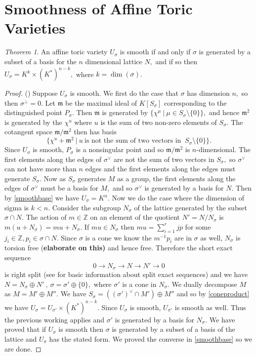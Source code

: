 \documentclass[BSc]{usydthesis}
\numberwithin{equation}{chapter}
\theoremstyle{remark}
\newtheorem{Theorem}[equation]{Theorem}
\newcommand{\Z}{\mathbb{Z}}
\newcommand{\V}{\vee}
\begin{document}
\section{Smoothness of Affine Toric Varieties}
\begin{Theorem}\label{Smooth} An affine toric variety $U_{\sigma}$ is smooth if and only if $\sigma$ is generated by a subset of a basis for the $n$ dimensional lattice $N,$ and if so then $U_{\sigma} = K^k \times (K^{*})^{n-k},$ where $k=\dim (\sigma).$ 
 
\end{Theorem}

\begin{proof}(\cite[Page.~ 28]{Fulton:Toric})
Suppose $U_{\sigma}$ is smooth. We first do the case that $\sigma$ has dimension $n,$ so then $\sigma^{\perp} = 0.$ Let $\mathfrak{m}$ be the maximal ideal of $K[S_{\sigma}]$ corresponding to the distinguished point $P_{\sigma}.$ Then $\mathfrak{m}$ is generated by $\{ \chi^{\mu} \ | \ \mu\in S_{\sigma}\setminus \{0\} \},$ and hence $\mathfrak{m}^2$ is generated by the $\chi^u$ where $u$ is the sum of two non-zero elements of $S_{\sigma}.$ The cotangent space $\mathfrak{m}/\mathfrak{m}^2$ then has basis $$\{ \chi^u + \mathfrak{m}^2 \ | \ u \ \text{is not the sum of two vectors in } \ S_{\sigma}\setminus\{ 0 \} \}.$$ Since $U_{\sigma}$ is smooth, $P_{\sigma}$ is a nonsingular point and so $\mathfrak{m}/\mathfrak{m}^2$ is $n$-dimensional. The first elements along the edges of $\sigma^{\V}$ are not the sum of two vectors in $S_{\sigma},$ so $\sigma^{\V}$ can not have more than $n$ edges and the first elements along the edges must generate $S_{\sigma}.$ Now as $S_{\sigma}$ generates $M$ as a group, the first elements along the edges of $\sigma^{\V}$ must be a basis for $M,$ and so $\sigma^{\V}$ is generated by a basis for $N.$ Then by \ref{smoothbase} we have $U_{\sigma} = K^n.$ Now we do the case where the dimension of sigma is $k<n.$ Consider the subgroup $N_{\sigma}$ of the lattice generated by the subset $\sigma \cap N.$ The action of $m\in \Z$ on an element of the quotient $N'=N/N_{\sigma}$ is $m(u+N_{\sigma})=mu+N_{\sigma}.$ If $mu\in N_{\sigma}$ then $mu= \sum_{i=1}^{r} jp$ for some $j_i\in \Z, p_i\in \sigma\cap N.$ Since $\sigma$ is a cone we know the $m^{-1}p_i$ are in $\sigma$ as well, $N_{\sigma}$ is torsion free {(\bf elaborate on this)} and hence free. Therefore the short exact sequence 
$$ 0 \rightarrow N_{\sigma} \rightarrow N \rightarrow N' \rightarrow 0$$
is right split (see \cite[Page.~ 45, \S 2.10]{Reid:Algebra} for basic information about split exact sequences) and we have $N = N_{\sigma} \oplus N' \ , \ \sigma = \sigma' \oplus \{0\},$ where $\sigma'$ is a cone in $N_{\sigma}.$ We dually decompose $M$ as $M = M' \oplus M''.$ We have $S_{\sigma} = ( (\sigma')^{\V} \cap M') \oplus M''$ and so by \ref{coneproduct} we have $U_{\sigma} = U_{\sigma'} \times (K^*)^{n-k}.$ Since $U_{\sigma}$ is smooth, $U_{\sigma'}$ is smooth as well. Thus the previous working applies and $\sigma'$ is generated by a basis for $N_{\sigma}.$ We have proved that if $U_{\sigma}$ is smooth then $\sigma$ is generated by a subset of a basis of the lattice and $U_{\sigma}$ has the stated form. We proved the converse in \ref{smoothbase} so we are done.
\end{proof}
\end{document}
